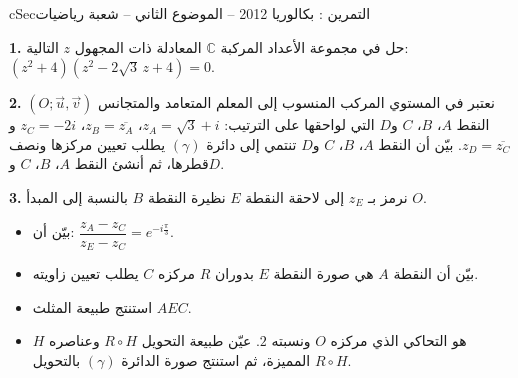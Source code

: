 \documentclass[12pt,a4paper]{article}
\newenvironment{BOX}[2]{\begin{otherlanguage}{english}\begin{arbox}{#1}{#2}}{\end{arbox}\end{otherlanguage}}
\newcounter{exo}
\newenvironment{tamrin}[1]{\stepcounter{exo}\begin{BOX}{cSec}{التمرين \theexo: #1}}{\end{BOX}}
\newenvironment{sq}{\begin{itemize}[leftmargin=2.4em,itemsep=3pt]}{\end{itemize}}
\newcommand{\qa}{\item[(أ)]}\newcommand{\qb}{\item[(ب)]}\newcommand{\qc}{\item[(جـ)]}\newcommand{\qd}{\item[(د)]}\newcommand{\qe}{\item[(هـ)]}
\newcommand{\QQ}[1]{\par\smallskip\textbf{#1.} }
\begin{document}
\begin{tamrin}{بكالوريا 2012 -- الموضوع الثاني -- شعبة رياضيات}
\QQ{1} حل في مجموعة الأعداد المركبة $\mathbb C$ المعادلة ذات المجهول $z$ التالية: $(z^2+4)(z^2-2\sqrt3\,z+4)=0$.
\QQ{2} نعتبر في المستوي المركب المنسوب إلى المعلم المتعامد والمتجانس $(O;\vec u,\vec v)$ النقط $A$، $B$، $C$ و$D$ التي لواحقها على الترتيب:
$z_A=\sqrt3+i$، $z_B=\overline{z_A}$، $z_C=-2i$ و$z_D=\overline{z_C}$.
بيّن أن النقط $A$، $B$، $C$ و$D$ تنتمي إلى دائرة $(\gamma)$ يطلب تعيين مركزها ونصف قطرها، ثم أنشئ النقط $A$، $B$، $C$ و$D$.
\QQ{3} نرمز بـ $z_E$ إلى لاحقة النقطة $E$ نظيرة النقطة $B$ بالنسبة إلى المبدأ $O$.
\begin{sq}
\qa بيّن أن: $\dfrac{z_A-z_C}{z_E-z_C}=e^{-i\frac{\pi}{3}}$.
\qb بيّن أن النقطة $A$ هي صورة النقطة $E$ بدوران $R$ مركزه $C$ يطلب تعيين زاويته.
\qc استنتج طبيعة المثلث $AEC$.
\qd $H$ هو التحاكي الذي مركزه $O$ ونسبته $2$. عيّن طبيعة التحويل $R\circ H$ وعناصره المميزة، ثم استنتج صورة الدائرة $(\gamma)$ بالتحويل $R\circ H$.
\end{sq}
\end{tamrin}
\end{document}
